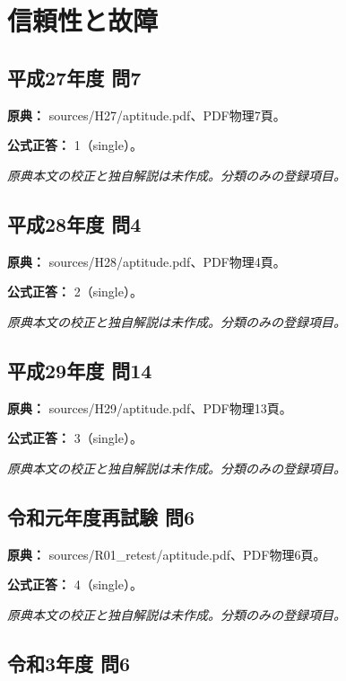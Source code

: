 \section{信頼性と故障}

\subsection{平成27年度 問7}
\label{q:h27-reg-apt-07}

\noindent\textbf{原典：} sources/H27/aptitude.pdf、PDF物理7頁。

\textbf{公式正答：} 1（single）。

\par\textit{原典本文の校正と独自解説は未作成。分類のみの登録項目。}

\subsection{平成28年度 問4}
\label{q:h28-reg-apt-04}

\noindent\textbf{原典：} sources/H28/aptitude.pdf、PDF物理4頁。

\textbf{公式正答：} 2（single）。

\par\textit{原典本文の校正と独自解説は未作成。分類のみの登録項目。}

\subsection{平成29年度 問14}
\label{q:h29-reg-apt-14}

\noindent\textbf{原典：} sources/H29/aptitude.pdf、PDF物理13頁。

\textbf{公式正答：} 3（single）。

\par\textit{原典本文の校正と独自解説は未作成。分類のみの登録項目。}

\subsection{令和元年度再試験 問6}
\label{q:r01-ret-apt-06}

\noindent\textbf{原典：} sources/R01\_retest/aptitude.pdf、PDF物理6頁。

\textbf{公式正答：} 4（single）。

\par\textit{原典本文の校正と独自解説は未作成。分類のみの登録項目。}

\subsection{令和3年度 問6}
\label{q:r03-reg-apt-06}

